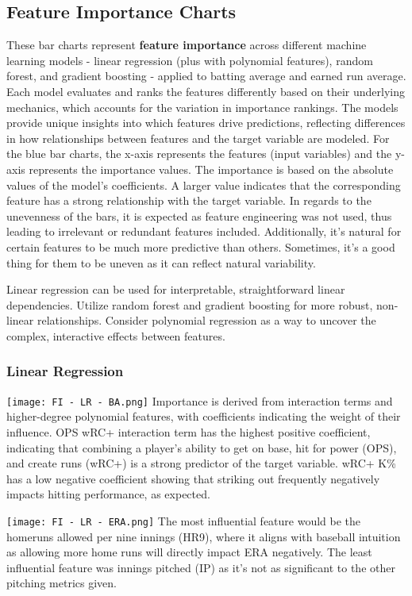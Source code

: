 \documentclass[10pt,twocolumn]{article}
\begin{document}
\subsection{Feature Importance Charts}

These bar charts represent \textbf{feature importance} across different machine learning models - linear regression (plus with polynomial features), random forest, and gradient boosting - applied to batting average and earned run average. Each model evaluates and ranks the features differently based on their underlying mechanics, which accounts for the variation in importance rankings. The models provide unique insights into which features drive predictions, reflecting differences in how relationships between features and the target variable are modeled. For the blue bar charts, the x-axis represents the features (input variables) and the y-axis represents the importance values. The importance is based on the absolute values of the model’s coefficients. A larger value indicates that the corresponding feature has a strong relationship with the target variable. In regards to the unevenness of the bars, it is expected as feature engineering was not used, thus leading to irrelevant or redundant features included. Additionally, it’s natural for certain features to be much more predictive than others. Sometimes, it’s a good thing for them to be uneven as it can reflect natural variability. 

Linear regression can be used for interpretable, straightforward linear dependencies. Utilize random forest and gradient boosting for more robust, non-linear relationships. Consider polynomial regression as a way to uncover the complex, interactive effects between features. 
 
\subsubsection{Linear Regression}
{\centering
\texttt{[image: FI - LR - BA.png]}}
Importance is derived from interaction terms and higher-degree polynomial features, with coefficients indicating the weight of their influence. OPS wRC+ interaction term has the highest positive coefficient, indicating that combining a player’s ability to get on base, hit for power (OPS), and create runs (wRC+) is a strong predictor of the target variable. wRC+ K\% has a low negative coefficient showing that striking out frequently negatively impacts hitting performance, as expected. 

 
{\centering
\texttt{[image: FI - LR - ERA.png]}}
The most influential feature would be the homeruns allowed per nine innings (HR9), where it aligns with baseball intuition as allowing more home runs will directly impact ERA negatively. The least influential feature was innings pitched (IP) as it’s not as significant to the other pitching metrics given. 
\end{document}

